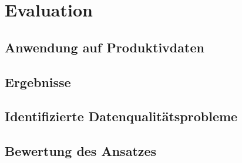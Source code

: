 \documentclass[../main.tex]{subfiles}
\begin{document}
\chapter{Evaluation}
\label{chap:evaluation}

\section{Anwendung auf Produktivdaten}

\section{Ergebnisse}

\section{Identifizierte Datenqualitätsprobleme}

\section{Bewertung des Ansatzes}
\end{document}
